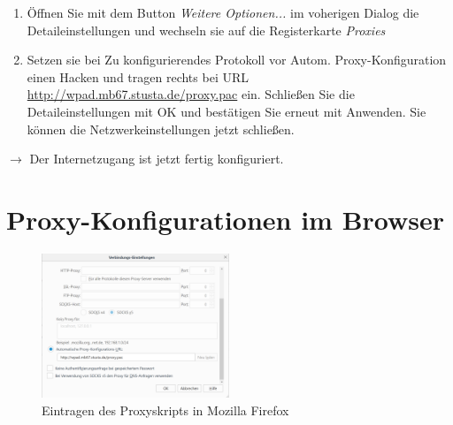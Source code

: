 \documentclass[a4paper,12pt]{scrartcl}
\begin{document}
\begin{enumerate}%
    \item Öffnen Sie mit dem Button \emph{Weitere Optionen...} im voherigen Dialog die Detaileinstellungen und wechseln sie auf die Registerkarte \emph{Proxies}
    \item Setzen sie bei Zu konfigurierendes Protokoll vor Autom. Proxy-Konfiguration einen Hacken und tragen rechts bei URL \url{http://wpad.mb67.stusta.de/proxy.pac} ein. Schließen Sie die Detaileinstellungen mit OK und bestätigen Sie erneut mit Anwenden. Sie können die Netzwerkeinstellungen jetzt schließen.
\end{enumerate}
$\rightarrow$ Der Internetzugang ist jetzt fertig konfiguriert.

\newpage

\section*{Proxy-Konfigurationen im Browser}
\label{Proxy}

\begin{figure}
  \vspace{-40pt}
  \begin{center}
    \includegraphics[width=0.5\textwidth,keepaspectratio]{Bilder/Proxy_Firefox_mb}
  \end{center}
  \caption{Eintragen des Proxyskripts in Mozilla Firefox}
\end{figure}
\end{document}
